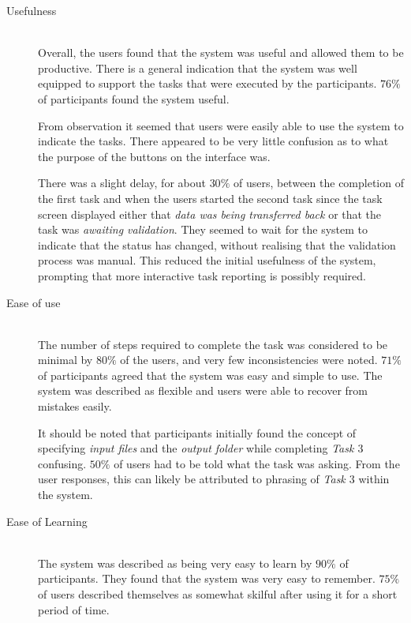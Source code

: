 \begin{description}
    \item[Usefulness] \hfill \\
    	Overall, the users found that the system was useful and allowed them to be
    	productive. There is a general indication that the system was well
    	equipped to support the tasks that were executed by the participants.
	$76\%$ of participants found the system useful.

    	From observation it seemed that users were easily able to use the system
    	to indicate the tasks. There appeared to be very little confusion as to
    	what the purpose of the buttons on the interface was.

    	There was a slight delay, for about $30\%$ of users, between the
	completion of the first task and
    	when the users started the second task since the task screen displayed
    	either that \emph{data was being transferred back} or that the task
    	was \emph{awaiting validation}. They seemed to wait for the system to
    	indicate that the status has changed, without realising that the
    	validation process was manual. This reduced the initial usefulness of
    	the system, prompting that more interactive task reporting is possibly
    	required.
    \item[Ease of use] \hfill \\
    	The number of steps required to complete the task was considered to be
    	minimal by $80\%$ of the users, and very few inconsistencies were
	noted. $71\%$ of participants agreed that the system was easy
	and simple to
    	use. The system was described as flexible and users were able to
    	recover from mistakes easily.

    	It should be noted that participants initially found the concept of
    	specifying \emph{input files} and the \emph{output folder} while
    	completing \emph{Task $3$} confusing. $50\%$ of users had to be told
    	what the task was asking. From the user responses, this can likely be
    	attributed to phrasing of \emph{Task $3$} within the system.

    \item[Ease of Learning] \hfill \\
        The system was described as being very easy to learn by  $90\%$ of
    	participants. They found that the system was very easy to remember.
    	$75\%$ of users described themselves as somewhat skilful after using
	it for a short	period of time.


\end{description}
